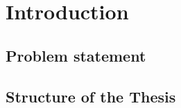 \chapter{Introduction}
\label{chapter:intro}

\section{Problem statement}

\section{Structure of the Thesis}
\label{section:structure} 

